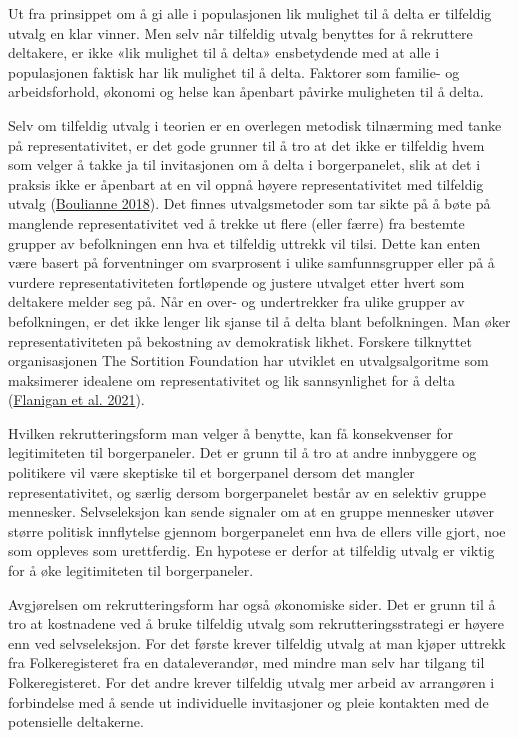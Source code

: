 \documentclass[
  12pt,
  a4paper, 12pt]{article}
\begin{document}
Ut fra prinsippet om å gi alle i populasjonen lik mulighet til å delta er tilfeldig utvalg en klar vinner. Men selv når tilfeldig utvalg benyttes for å rekruttere deltakere, er ikke «lik mulighet til å delta» ensbetydende med at alle i populasjonen faktisk har lik mulighet til å delta. Faktorer som familie- og arbeidsforhold, økonomi og helse kan åpenbart påvirke muligheten til å delta.

Selv om tilfeldig utvalg i teorien er en overlegen metodisk tilnærming med tanke på representativitet, er det gode grunner til å tro at det ikke er tilfeldig hvem som velger å takke ja til invitasjonen om å delta i borgerpanelet, slik at det i praksis ikke er åpenbart at en vil oppnå høyere representativitet med tilfeldig utvalg (\protect\hyperlink{ref-boulianne_beyond_2018}{Boulianne 2018}). Det finnes utvalgsmetoder som tar sikte på å bøte på manglende representativitet ved å trekke ut flere (eller færre) fra bestemte grupper av befolkningen enn hva et tilfeldig uttrekk vil tilsi. Dette kan enten være basert på forventninger om svarprosent i ulike samfunnsgrupper eller på å vurdere representativiteten fortløpende og justere utvalget etter hvert som deltakere melder seg på. Når en over- og undertrekker fra ulike grupper av befolkningen, er det ikke lenger lik sjanse til å delta blant befolkningen. Man øker representativiteten på bekostning av demokratisk likhet. Forskere tilknyttet organisasjonen The Sortition Foundation har utviklet en utvalgsalgoritme som maksimerer idealene om representativitet og lik sannsynlighet for å delta (\protect\hyperlink{ref-flanigan_fair_2021}{Flanigan et al. 2021}).

Hvilken rekrutteringsform man velger å benytte, kan få konsekvenser for legitimiteten til borgerpaneler. Det er grunn til å tro at andre innbyggere og politikere vil være skeptiske til et borgerpanel dersom det mangler representativitet, og særlig dersom borgerpanelet består av en selektiv gruppe mennesker. Selvseleksjon kan sende signaler om at en gruppe mennesker utøver større politisk innflytelse gjennom borgerpanelet enn hva de ellers ville gjort, noe som oppleves som urettferdig. En hypotese er derfor at tilfeldig utvalg er viktig for å øke legitimiteten til borgerpaneler.

Avgjørelsen om rekrutteringsform har også økonomiske sider. Det er grunn til å tro at kostnadene ved å bruke tilfeldig utvalg som rekrutteringsstrategi er høyere enn ved selvseleksjon. For det første krever tilfeldig utvalg at man kjøper uttrekk fra Folkeregisteret fra en dataleverandør, med mindre man selv har tilgang til Folkeregisteret. For det andre krever tilfeldig utvalg mer arbeid av arrangøren i forbindelse med å sende ut individuelle invitasjoner og pleie kontakten med de potensielle deltakerne.
\end{document}
